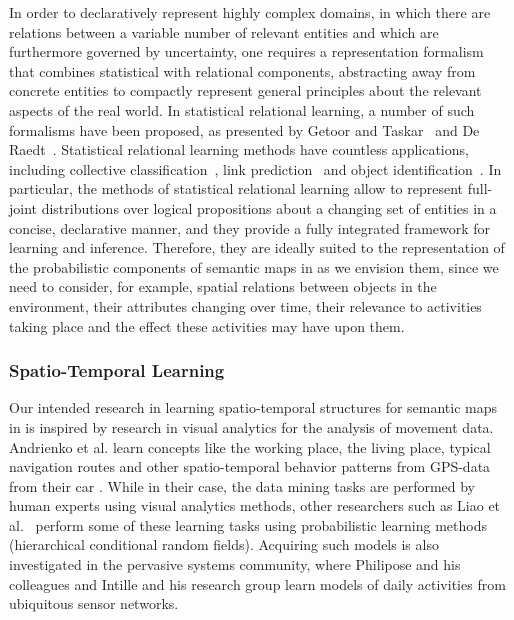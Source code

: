 In order to declaratively represent highly complex domains, in which there are relations between a variable
number of relevant entities and which are furthermore governed by uncertainty, one requires a representation
formalism that combines statistical with relational components, abstracting away from concrete entities
to compactly represent general principles about the relevant aspects of the real world.
In statistical relational learning, a number of such formalisms have been proposed,
as presented by Getoor and Taskar~\cite{getoor07introduction} and De Raedt~\cite{DeRaedt08Learning}.
Statistical relational learning methods have countless applications, including collective classification~\cite{neville03collective},
link prediction~\cite{taskar03link} and object identification~\cite{singla06entity}.
In particular, the methods of statistical relational learning allow
to represent full-joint distributions over logical propositions about a changing set of entities in
a concise, declarative manner, and they provide a fully integrated framework for learning and inference. Therefore,
they are ideally suited to the representation of the probabilistic components of semantic maps in \ksem as we envision them,
since we need to consider, for example, spatial relations between objects in the environment, their attributes
changing over time, their relevance to activities taking place and the effect these activities may have upon them.

\subsubsection{Spatio-Temporal Learning}
\label{sec:spatio-temporal-learning}

Our intended research in learning spatio-temporal structures for
semantic maps in \ksem is inspired by research in visual analytics for the analysis
of movement data. Andrienko et al. learn concepts like the
working place, the living place, typical navigation routes and other
spatio-temporal behavior patterns from GPS-data from their car
\cite{Andrienko07}. While in their case, the data mining tasks are
performed by human experts using visual analytics methods, other
researchers such as Liao et al.\ \cite{Liao07a,Liao07b} perform some
of these learning tasks using probabilistic learning
methods (hierarchical conditional random fields).
Acquiring such models is also investigated in the pervasive
systems community, where Philipose and his colleagues
\cite{Pentney07,Landwehr07} and Intille and his research group
\cite{Intille06} learn models of daily activities from ubiquitous
sensor networks.

